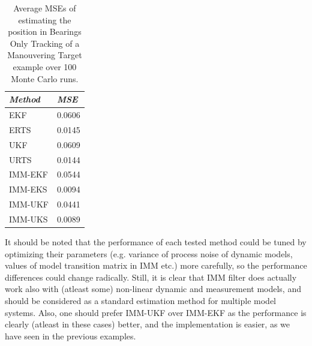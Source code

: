 %  
\begin{table}
\begin{center}
\begin{tabular}{|l|l|} \hline {\it Method}&{\it MSE } \\ \hline EKF &
0.0606 \\ ERTS & 0.0145 \\ UKF & 0.0609 \\ URTS & 0.0144 \\ IMM-EKF &
0.0544 \\ IMM-EKS & 0.0094 \\ IMM-UKF & 0.0441 \\ IMM-UKS & 0.0089 \\
\hline
\end{tabular}
\caption{Average MSEs of estimating the position in Bearings Only
Tracking of a Manouvering Target example over 100 Monte Carlo runs.}
\label{table:eimm_rmse2}
\end{center}
\end{table}
%

It should be noted that the performance of each tested method could be
tuned by optimizing their parameters (e.g. variance of process noise
of dynamic models, values of model transition matrix in IMM etc.)
more carefully, so the performance differences could change
radically. Still, it is clear that IMM filter does actually work also
with (atleast some) non-linear dynamic and measurement models, and
should be considered as a standard estimation method for multiple
model systems. Also, one should prefer IMM-UKF over IMM-EKF as the
performance is clearly (atleast in these cases) better, and the
implementation is easier, as we have seen in the previous examples.

